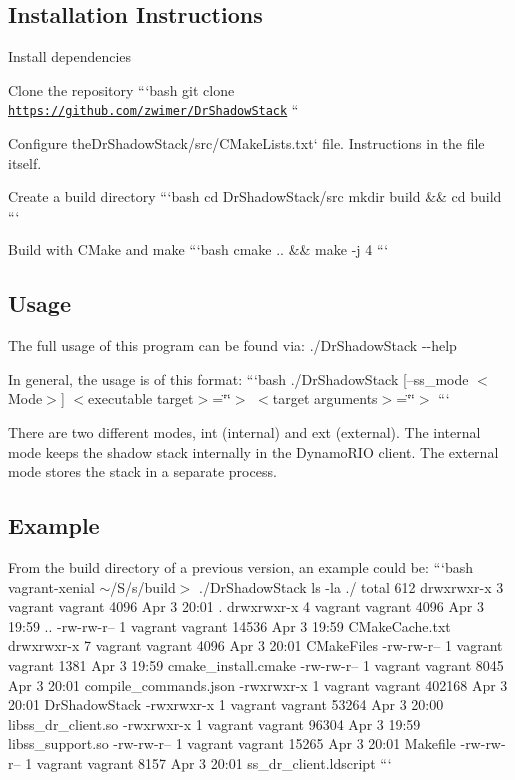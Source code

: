 \subsection*{Installation Instructions}


\begin{DoxyEnumerate}
\item Install dependencies
\item Clone the repository ```bash git clone \href{https://github.com/zwimer/DrShadowStack}{\tt https\-://github.\-com/zwimer/\-Dr\-Shadow\-Stack} ``{\ttfamily }
\item {\ttfamily Configure the}Dr\-Shadow\-Stack/src/\-C\-Make\-Lists.\-txt` file. Instructions in the file itself.
\item Create a build directory ```bash cd Dr\-Shadow\-Stack/src mkdir build \&\& cd build ```
\item Build with C\-Make and make ```bash cmake .. \&\& make -\/j 4 ```
\end{DoxyEnumerate}

\subsection*{Usage}

The full usage of this program can be found via\-: {\ttfamily ./\-Dr\-Shadow\-Stack -\/-\/help}

In general, the usage is of this format\-: ```bash ./\-Dr\-Shadow\-Stack \mbox{[}--ss\-\_\-mode $<$\-Mode$>$\mbox{]} $<$executable target$>$=\char`\"{}\char`\"{}$>$ $<$target arguments$>$=\char`\"{}\char`\"{}$>$ ```

There are two different modes, {\ttfamily int} (internal) and {\ttfamily ext} (external). The internal mode keeps the shadow stack internally in the Dynamo\-R\-I\-O client. The external mode stores the stack in a separate process.

\subsection*{Example}

From the build directory of a previous version, an example could be\-: ```bash vagrant-\/xenial $\sim$/\-S/s/build$>$ ./\-Dr\-Shadow\-Stack ls -\/la ./ total 612 drwxrwxr-\/x 3 vagrant vagrant 4096 Apr 3 20\-:01 . drwxrwxr-\/x 4 vagrant vagrant 4096 Apr 3 19\-:59 .. -\/rw-\/rw-\/r-- 1 vagrant vagrant 14536 Apr 3 19\-:59 C\-Make\-Cache.\-txt drwxrwxr-\/x 7 vagrant vagrant 4096 Apr 3 20\-:01 C\-Make\-Files -\/rw-\/rw-\/r-- 1 vagrant vagrant 1381 Apr 3 19\-:59 cmake\-\_\-install.\-cmake -\/rw-\/rw-\/r-- 1 vagrant vagrant 8045 Apr 3 20\-:01 compile\-\_\-commands.\-json -\/rwxrwxr-\/x 1 vagrant vagrant 402168 Apr 3 20\-:01 Dr\-Shadow\-Stack -\/rwxrwxr-\/x 1 vagrant vagrant 53264 Apr 3 20\-:00 libss\-\_\-dr\-\_\-client.\-so -\/rwxrwxr-\/x 1 vagrant vagrant 96304 Apr 3 19\-:59 libss\-\_\-support.\-so -\/rw-\/rw-\/r-- 1 vagrant vagrant 15265 Apr 3 20\-:01 Makefile -\/rw-\/rw-\/r-- 1 vagrant vagrant 8157 Apr 3 20\-:01 ss\-\_\-dr\-\_\-client.\-ldscript ```

